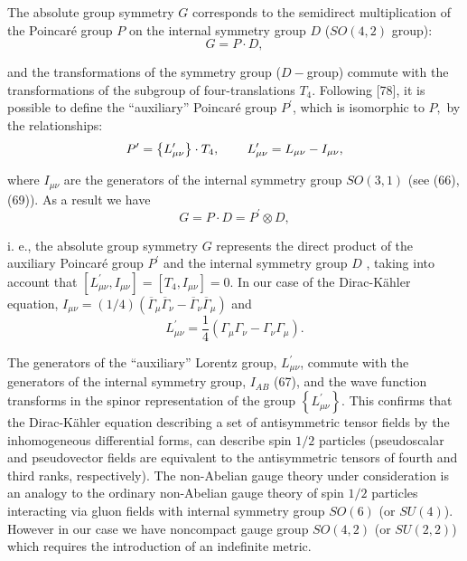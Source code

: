 \documentclass[a4paper,12pt]{article}
\begin{document}
The absolute group symmetry $G$ corresponds to the semidirect multiplication
of the Poincar\'e group $P$ on the internal symmetry group $D$ ($SO(4,2)$
group):
\begin{equation}
G=P\cdot D  ,\label{133}
\end{equation}

and the transformations of the symmetry group ($D-$group) commute
with the transformations of the subgroup of four-translations
$T_4$. Following [78], it is possible to define the ``auxiliary''
Poincar\'e group $P^{\prime }$, which is isomorphic to $P,$ by the
relationships:
\begin{equation}
P^{\prime }=\left\{ L_{\mu \nu }^{\prime }\right\} \cdot T_4 ,
\hspace{0.3in} L_{\mu \nu }^{\prime }=L_{\mu \nu }-I_{\mu \nu } ,
\label{134}
\end{equation}

where $I_{\mu \nu }$ are the generators of the internal symmetry
group $ SO(3,1)$ (see (66), (69)). As a result we have
\begin{equation}
G=P\cdot D=P^{\prime }\otimes D  ,\label{135}
\end{equation}

i. e., the absolute group symmetry $G$ represents the direct
product of the auxiliary Poincar\'e group $P^{\prime }$ and the
internal symmetry group $D$ , taking into account that $\left[
L_{\mu \nu }^{\prime },I_{\mu \nu }\right] =\left[ T_4,I_{\mu \nu
}\right] =0$. In our case of the Dirac-K\"ahler equation, $I_{\mu
\nu }=(1/4)(\overline{\Gamma }_\mu \overline{\Gamma }_\nu
-\overline{\Gamma }_\nu \overline{\Gamma }_\mu )$ and
\begin{equation}
L_{\mu \nu }^{\prime }=\frac 14\left( \Gamma _\mu \Gamma _\nu
-\Gamma _\nu \Gamma _\mu \right) . \label{136}
\end{equation}

The generators of the ``auxiliary'' Lorentz group, $L_{\mu \nu
}^{\prime }$, commute with the generators of the internal symmetry
group, $I_{AB}$ (67), and the wave function transforms in the
spinor representation of the group $ \left\{ L_{\mu \nu }^{\prime
}\right\} $. This confirms that the Dirac-K\"ahler equation
describing a set of antisymmetric tensor fields by the
inhomogeneous differential forms, can describe spin $1/2$
particles (pseudoscalar and pseudovector fields are equivalent to
the antisymmetric tensors of fourth and third ranks,
respectively). The non-Abelian gauge theory under consideration is
an analogy to the ordinary non-Abelian gauge theory of spin $1/2$
particles interacting via gluon fields with internal symmetry
group $SO(6)$ (or $SU(4)$). However in our case we have noncompact
gauge group $SO(4,2)$ (or $SU(2,2)$) which requires the
introduction of an indefinite metric.
\end{document}
